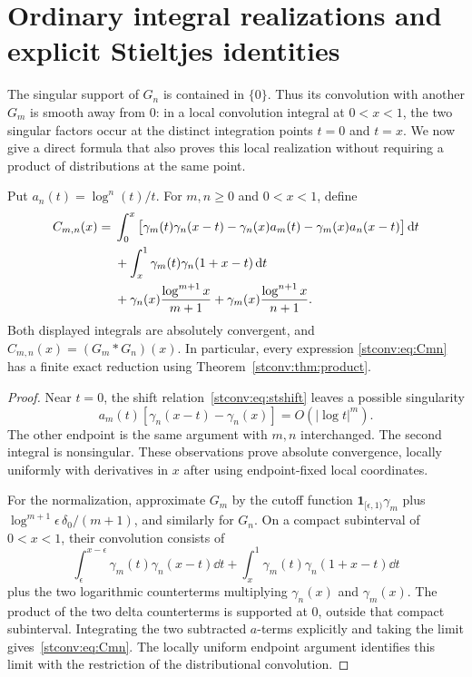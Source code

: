 \section{Ordinary integral realizations and explicit Stieltjes identities}
\label{stconv:sec:integrals}
The singular support of $G_n$ is contained in $\{0\}$. Thus its
convolution with another $G_m$ is smooth away from $0$: in a local
convolution integral at $0<x<1$, the two singular factors occur at the
distinct integration points $t=0$ and $t=x$. We now give a direct formula
that also proves this local realization without requiring a product of
distributions at the same point.

\begin{theorem}\label{stconv:thm:integral}
Put $a_n(t)=\log^n(t)/t$. For $m,n\ge0$ and $0<x<1$, define
\begin{align}
 C_{m,n}(x)={}&\int_0^x\big[\gamma_m(t)\gamma_n(x-t)
          -\gamma_n(x)a_m(t)-\gamma_m(x)a_n(x-t)\big]\,\mathrm d t
          \label{stconv:eq:Cmn}\\
 &+\int_x^1\gamma_m(t)\gamma_n(1+x-t)\,\mathrm d t\notag\\
 &+\gamma_n(x)\frac{\log^{m+1}x}{m+1}
  +\gamma_m(x)\frac{\log^{n+1}x}{n+1}.\notag
\end{align}
Both displayed integrals are absolutely convergent, and
$C_{m,n}(x)=(G_m*G_n)(x)$. In particular, every expression
\eqref{stconv:eq:Cmn} has a finite exact reduction using Theorem~\ref{stconv:thm:product}.
\end{theorem}
\begin{proof}
Near $t=0$, the shift relation~\eqref{stconv:eq:stshift} leaves a possible
singularity
\[
 a_m(t)[\gamma_n(x-t)-\gamma_n(x)]=O(|\log t|^m).
\]
The other endpoint is the same argument with $m,n$ interchanged. The
second integral is nonsingular. These observations prove absolute
convergence, locally uniformly with derivatives in $x$ after using
endpoint-fixed local coordinates.

For the normalization, approximate $G_m$ by the cutoff function
$\mathbf1_{[\epsilon,1)}\gamma_m$ plus
$\log^{m+1}\epsilon\,\delta_0/(m+1)$, and similarly for $G_n$. On a
compact subinterval of $0<x<1$, their convolution consists of
\[
 \int_\epsilon^{x-\epsilon}\gamma_m(t)\gamma_n(x-t)\dd t
 +\int_x^1\gamma_m(t)\gamma_n(1+x-t)\dd t
\]
plus the two logarithmic counterterms multiplying $\gamma_n(x)$ and
$\gamma_m(x)$. The product of the two delta counterterms is supported
at $0$, outside that compact subinterval. Integrating the two subtracted
$a$-terms explicitly and taking the limit gives~\eqref{stconv:eq:Cmn}.
The locally uniform endpoint argument identifies this limit with the
restriction of the distributional convolution.
\end{proof}

